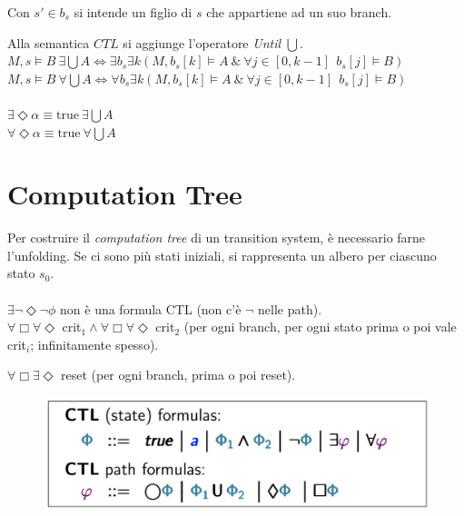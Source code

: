 \documentclass[a4paper, notitlepage, 9pt]{extreport}
\begin{document}
\begin{multicols}{2}
\begin{figure}[H]
\end{figure}
\noindent
Con $s' \in b_s$ si intende un figlio di $s$ che appartiene ad un suo branch.
\end{multicols}

\noindent
Alla semantica $CTL$ si aggiunge l'operatore \textit{Until} $\bigcup$.\\
$M, s \vDash B ~\exists \bigcup A \Leftrightarrow \exists b_s \exists k (M, b_s[k] \vDash A ~\&~ \forall j\in [0, k-1] ~~b_s[j] \vDash B)$\\
$M, s \vDash B ~\forall \bigcup A \Leftrightarrow \forall b_s \exists k (M, b_s[k] \vDash A ~\&~ \forall j\in [0, k-1] ~~b_s[j] \vDash B)$\\\\
$\exists \Diamond \alpha \equiv \text{true} ~\exists \bigcup A$\\
$\forall \Diamond \alpha \equiv \text{true} ~\forall \bigcup A$


\section*{Computation Tree}
\begin{multicols}{2}
	\noindent
	Per costruire il \textit{computation tree} di un transition system, è necessario farne l'unfolding. Se ci sono più stati iniziali, si rappresenta un albero per ciascuno stato $s_0$.\\\\	
	$\exists \lnot \Diamond \lnot \phi$ non è una formula CTL (non c'è $\lnot$ nelle path).\\
	$\forall \Box \forall \Diamond$ crit$_1 \land \forall \Box \forall \Diamond$ crit$_2$ (per ogni branch, per ogni stato prima o poi vale crit$_i$; infinitamente spesso).
\columnbreak

$\forall \Box \exists \Diamond$ reset (per ogni branch, prima o poi reset).
	\begin{figure}[H]
		\centering
		\includegraphics[scale=0.26]{CTL2}
	\end{figure}
\end{multicols}
\end{document}
